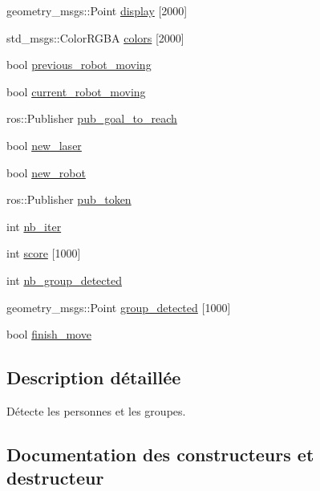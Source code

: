 \begin{DoxyCompactItemize}
geometry\+\_\+msgs\+::\+Point \hyperlink{classmoving__persons__detector_a7a74890a878182e5e70a7a72feb6b648}{display} \mbox{[}2000\mbox{]}
\item 
std\+\_\+msgs\+::\+Color\+R\+G\+BA \hyperlink{classmoving__persons__detector_af658a75f3cf4bd684fb2a282ce52af04}{colors} \mbox{[}2000\mbox{]}
\item 
bool \hyperlink{classmoving__persons__detector_a782b66e8437a7e2d8501d0eefe4eedc4}{previous\+\_\+robot\+\_\+moving}
\item 
bool \hyperlink{classmoving__persons__detector_ac3e2309e03a591892b8b13ba51df6831}{current\+\_\+robot\+\_\+moving}
\item 
ros\+::\+Publisher \hyperlink{classmoving__persons__detector_a8e87dbae89154f33ce2a2275c1599b10}{pub\+\_\+goal\+\_\+to\+\_\+reach}
\item 
bool \hyperlink{classmoving__persons__detector_a379e4d7d62fc6b2a163464b728177463}{new\+\_\+laser}
\item 
bool \hyperlink{classmoving__persons__detector_a4eace803293c56e7ee5b33093ea3cdea}{new\+\_\+robot}
\item 
ros\+::\+Publisher \hyperlink{classmoving__persons__detector_af6a77470dc3e40277e9e8e08d4afd7cf}{pub\+\_\+token}
\item 
int \hyperlink{classmoving__persons__detector_a798768403d1a8a3964ca22723fbd3918}{nb\+\_\+iter}
\item 
int \hyperlink{classmoving__persons__detector_ab92fa10f71867379e997220065b5ce38}{score} \mbox{[}1000\mbox{]}
\item 
int \hyperlink{classmoving__persons__detector_a7f33b7e0a227a032dc845a74cc805837}{nb\+\_\+group\+\_\+detected}
\item 
geometry\+\_\+msgs\+::\+Point \hyperlink{classmoving__persons__detector_a40e04cd6cda49ccc016b5881d048c46a}{group\+\_\+detected} \mbox{[}1000\mbox{]}
\item 
bool \hyperlink{classmoving__persons__detector_ab9eaeb335101abe8964220a7f41fdcab}{finish\+\_\+move}
\end{DoxyCompactItemize}


\subsection{Description détaillée}
Détecte les personnes et les groupes. 

\subsection{Documentation des constructeurs et destructeur}
